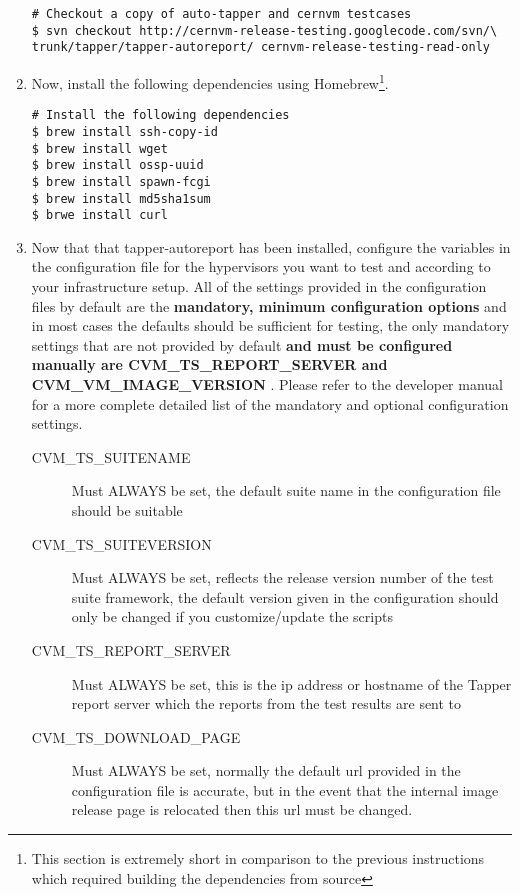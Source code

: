 \begin{enumerate}
\begin{lstlisting}
# Checkout a copy of auto-tapper and cernvm testcases
$ svn checkout http://cernvm-release-testing.googlecode.com/svn/\
trunk/tapper/tapper-autoreport/ cernvm-release-testing-read-only
\end{lstlisting}

\item        Now, install the following dependencies using Homebrew\footnote{This section is extremely short in comparison to the previous
                instructions which required building the dependencies from source}.
                
\lstset{language=bash,caption=Install Dependencies}
\begin{lstlisting}
# Install the following dependencies
$ brew install ssh-copy-id
$ brew install wget
$ brew install ossp-uuid
$ brew install spawn-fcgi
$ brew install md5sha1sum
$ brwe install curl
\end{lstlisting}

\item	Now that that tapper-autoreport has been installed, configure the variables in the configuration file for the
		hypervisors you want to test and according to your \tapper infrastructure setup. All of the settings provided in
		the configuration files by default are the {\bf mandatory, minimum configuration options} and in most cases the
		defaults should be sufficient for testing, the only mandatory settings that are not provided by default {\bf and
		must be configured manually are CVM\_TS\_REPORT\_SERVER and CVM\_VM\_IMAGE\_VERSION }. Please refer to the developer manual
		for a more complete detailed list of the mandatory and optional configuration settings.

\begin{description}
\item[CVM\_TS\_SUITENAME]	Must ALWAYS be set, the default suite name in the configuration file should be suitable

	  		  
\item[CVM\_TS\_SUITEVERSION] 	Must ALWAYS be set, reflects the release version number of the test suite framework, the  default
								version given in the configuration should only be changed if you customize/update the scripts

\item[CVM\_TS\_REPORT\_SERVER]	Must ALWAYS be set, this is the ip address or hostname of the Tapper report server which the reports
      							from the test results are sent to
		
\item[CVM\_TS\_DOWNLOAD\_PAGE]	Must ALWAYS be set, normally the default url provided in the configuration file is accurate, but in the
								event that the internal \cernvm image release page is relocated then this url must be changed.


\end{description}
\end{enumerate}
